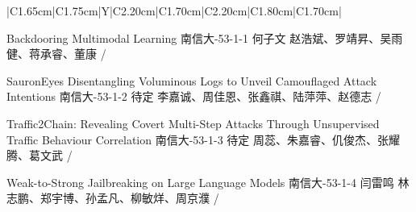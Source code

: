 \Needspace{7.5cm}
\begin{tabularx}{\textwidth}{|C{1.65cm}|C{1.75cm}|Y|C{2.20cm}|C{1.70cm}|C{2.20cm}|C{1.80cm}|C{1.70cm}|}
\HeaderRow

{Backdooring Multimodal Learning \newline }
{南信大-53-1-1}
{何子文}
{赵浩斌、罗靖昇、吴雨健、蒋承睿、董康}
{}{/}

{SauronEyes Disentangling Voluminous Logs to Unveil Camouflaged Attack Intentions \newline }
{南信大-53-1-2}
{待定}
{李嘉诚、周佳恩、张鑫祺、陆萍萍、赵德志}
{}{/}


{Traffic2Chain: Revealing Covert Multi-Step Attacks Through Unsupervised Traffic Behaviour Correlation \newline }
{南信大-53-1-3}
{待定}
{周蕊、朱嘉睿、仉俊杰、张耀腾、葛文武}
{}{/}

{Weak-to-Strong Jailbreaking on Large Language Models \newline }
{南信大-53-1-4}
{闫雷鸣}
{林志鹏、郑宇博、孙孟凡、柳敏烊、周京濮}
{}{/}
\end{tabularx}
\BlockGap






